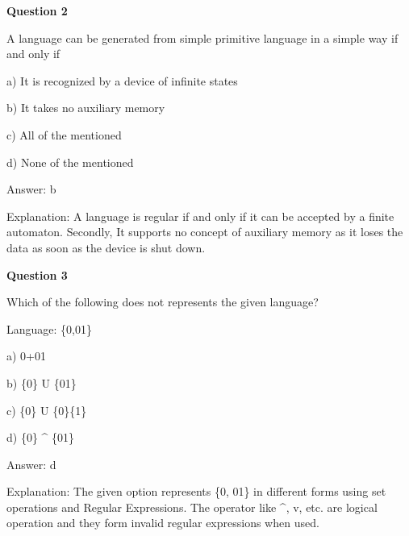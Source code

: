 \documentclass{article}
\begin{document}
\begin{mdframed}[linewidth=1pt, roundcorner=5pt, linecolor=gray!30, backgroundcolor=gray!5]
\textbf{Question 2} 

A language can be generated from simple primitive language in a simple way if and only if

a) It is recognized by a device of infinite states

b) It takes no auxiliary memory

c) All of the mentioned

d) None of the mentioned
\vspace{5pt} \par
\begin{tcolorbox}[colback=green!5, colframe=green!40!black, title=Solution]
Answer: b

Explanation: A language is regular if and only if it can be accepted by a finite automaton. Secondly, It supports no concept of auxiliary memory as it loses the data as soon as the device is shut down.
\end{tcolorbox}
\end{mdframed}

\begin{mdframed}[linewidth=1pt, roundcorner=5pt, linecolor=gray!30, backgroundcolor=gray!5]
\textbf{Question 3} 

Which of the following does not represents the given language?

Language: \{0,01\}

a) 0+01

b) \{0\} U \{01\}

c) \{0\} U \{0\}\{1\}

d) \{0\} \textasciicircum{} \{01\}
\vspace{5pt} \par
\begin{tcolorbox}[colback=green!5, colframe=green!40!black, title=Solution]
Answer: d

Explanation: The given option represents \{0, 01\} in different forms using set operations and Regular Expressions. The operator like \textasciicircum{}, v, etc. are logical operation and they form invalid regular expressions when used.
\end{tcolorbox}
\end{mdframed}
\newpage
\end{document}
